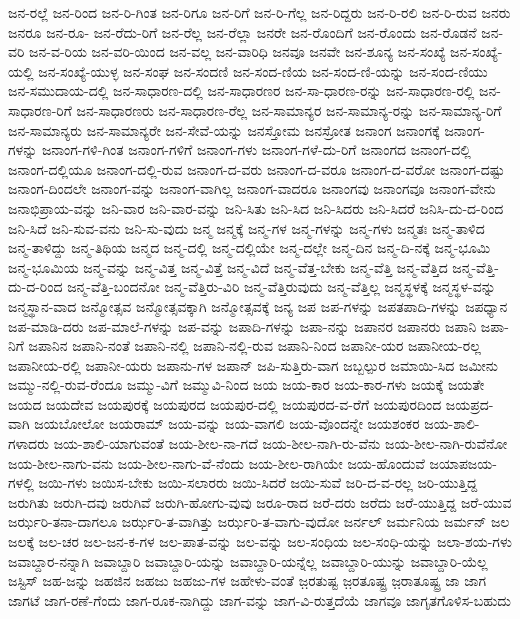 {ಜನ-ರಲ್ಲೆ
ಜನ-ರಿಂದ
ಜನ-ರಿ-ಗಿಂತ
ಜನ-ರಿಗೂ
ಜನ-ರಿಗೆ
ಜನ-ರಿ-ಗೆಲ್ಲ
ಜನ-ರಿದ್ದರು
ಜನ-ರಿ-ರಲಿ
ಜನ-ರಿ-ರುವ
ಜನರು
ಜನರೂ
ಜನ-ರೂ-
ಜನ-ರೆದು-ರಿಗೆ
ಜನ-ರೆಲ್ಲ
ಜನ-ರೆಲ್ಲಾ
ಜನರೇ
ಜನ-ರೊಂದಿಗೆ
ಜನ-ರೊಂದು
ಜನ-ರೊಡನೆ
ಜನ-ವರಿ
ಜನ-ವ-ರಿಯ
ಜನ-ವರಿ-ಯಿಂದ
ಜನ-ವಲ್ಲ
ಜನ-ವಾರಿಧಿ
ಜನವೂ
ಜನವೇ
ಜನ-ಶೂನ್ಯ
ಜನ-ಸಂಖ್ಯೆ
ಜನ-ಸಂಖ್ಯೆ-ಯಲ್ಲಿ
ಜನ-ಸಂಖ್ಯೆ-ಯುಳ್ಳ
ಜನ-ಸಂಘ
ಜನ-ಸಂದಣಿ
ಜನ-ಸಂದ-ಣಿಯ
ಜನ-ಸಂದ-ಣಿ-ಯನ್ನು
ಜನ-ಸಂದ-ಣಿಯು
ಜನ-ಸಮುದಾಯ-ದಲ್ಲಿ
ಜನ-ಸಾಧಾರಣ-ದಲ್ಲಿ
ಜನ-ಸಾಧಾರಣರ
ಜನ-ಸಾ-ಧಾರಣ-ರನ್ನು
ಜನ-ಸಾಧಾರಣ-ರಲ್ಲಿ
ಜನ-ಸಾಧಾರಣ-ರಿಗೆ
ಜನ-ಸಾಧಾರಣರು
ಜನ-ಸಾಧಾರಣ-ರೆಲ್ಲ
ಜನ-ಸಾಮಾನ್ಯರ
ಜನ-ಸಾಮಾನ್ಯ-ರನ್ನು
ಜನ-ಸಾಮಾನ್ಯ-ರಿಗೆ
ಜನ-ಸಾಮಾನ್ಯರು
ಜನ-ಸಾಮಾನ್ಯರೇ
ಜನ-ಸೇವೆ-ಯನ್ನು
ಜನಸ್ತೋಮ
ಜನಸ್ರೋತ
ಜನಾಂಗ
ಜನಾಂಗಕ್ಕೆ
ಜನಾಂಗ-ಗಳನ್ನು
ಜನಾಂಗ-ಗಳಿ-ಗಿಂತ
ಜನಾಂಗ-ಗಳಿಗೆ
ಜನಾಂಗ-ಗಳು
ಜನಾಂಗ-ಗಳೆ-ದು-ರಿಗೆ
ಜನಾಂಗದ
ಜನಾಂಗ-ದಲ್ಲಿ
ಜನಾಂಗ-ದಲ್ಲಿಯೂ
ಜನಾಂಗ-ದಲ್ಲಿ-ರುವ
ಜನಾಂಗ-ದ-ವರು
ಜನಾಂಗ-ದ-ವರೂ
ಜನಾಂಗ-ದ-ವರೋ
ಜನಾಂಗ-ದಷ್ಟು
ಜನಾಂಗ-ದಿಂದಲೇ
ಜನಾಂಗ-ವನ್ನು
ಜನಾಂಗ-ವಾಗಿಲ್ಲ
ಜನಾಂಗ-ವಾದರೂ
ಜನಾಂಗವು
ಜನಾಂಗವೂ
ಜನಾಂಗ-ವೇನು
ಜನಾಭಿಪ್ರಾಯ-ವನ್ನು
ಜನಿ-ವಾರ
ಜನಿ-ವಾರ-ವನ್ನು
ಜನಿ-ಸಿತು
ಜನಿ-ಸಿದ
ಜನಿ-ಸಿದರು
ಜನಿ-ಸಿದರೆ
ಜನಿಸಿ-ದು-ದ-ರಿಂದ
ಜನಿ-ಸಿದೆ
ಜನಿ-ಸುವ-ವನು
ಜನಿ-ಸು-ವುದು
ಜನ್ಮ
ಜನ್ಮಕ್ಕೆ
ಜನ್ಮ-ಗಳ
ಜನ್ಮ-ಗಳನ್ನು
ಜನ್ಮ-ಗಳು
ಜನ್ಮತಃ
ಜನ್ಮ-ತಾಳಿದ
ಜನ್ಮ-ತಾಳಿದ್ದು
ಜನ್ಮ-ತಿಥಿಯ
ಜನ್ಮದ
ಜನ್ಮ-ದಲ್ಲಿ
ಜನ್ಮ-ದಲ್ಲಿಯೇ
ಜನ್ಮ-ದಲ್ಲೇ
ಜನ್ಮ-ದಿನ
ಜನ್ಮ-ದಿ-ನಕ್ಕೆ
ಜನ್ಮ-ಭೂಮಿ
ಜನ್ಮ-ಭೂಮಿಯ
ಜನ್ಮ-ವನ್ನು
ಜನ್ಮ-ವಿತ್ತ
ಜನ್ಮ-ವಿತ್ತೆ
ಜನ್ಮ-ವಿದೆ
ಜನ್ಮ-ವೆತ್ತ-ಬೇಕು
ಜನ್ಮ-ವೆತ್ತಿ
ಜನ್ಮ-ವೆತ್ತಿದ
ಜನ್ಮ-ವೆತ್ತಿ-ದು-ದ-ರಿಂದ
ಜನ್ಮ-ವೆತ್ತಿ-ಬಂದನೋ
ಜನ್ಮ-ವೆತ್ತಿರು-ವಿರಿ
ಜನ್ಮ-ವೆತ್ತಿರುವುದು
ಜನ್ಮ-ವೆತ್ತಿಲ್ಲ
ಜನ್ಮಸ್ಥಳಕ್ಕೆ
ಜನ್ಮಸ್ಥಳ-ವನ್ನು
ಜನ್ಮಸ್ಥಾನ-ವಾದ
ಜನ್ಮೋತ್ಸವ
ಜನ್ಮೋತ್ಸವಕ್ಕಾಗಿ
ಜನ್ಮೋತ್ಸವಕ್ಕೆ
ಜನ್ಯ
ಜಪ
ಜಪ-ಗಳನ್ನು
ಜಪತಪಾದಿ-ಗಳನ್ನು
ಜಪಧ್ಯಾನ
ಜಪ-ಮಾಡಿ-ದರು
ಜಪ-ಮಾಲೆ-ಗಳನ್ನು
ಜಪ-ವನ್ನು
ಜಪಾದಿ-ಗಳನ್ನು
ಜಪಾ-ನನ್ನು
ಜಪಾನರ
ಜಪಾನರು
ಜಪಾನಿ
ಜಪಾ-ನಿಗೆ
ಜಪಾನಿನ
ಜಪಾನಿ-ನಂತೆ
ಜಪಾನಿ-ನಲ್ಲಿ
ಜಪಾನಿ-ನಲ್ಲಿ-ರುವ
ಜಪಾನಿ-ನಿಂದ
ಜಪಾನೀ-ಯರ
ಜಪಾನೀಯ-ರಲ್ಲ
ಜಪಾನೀಯ-ರಲ್ಲಿ
ಜಪಾನೀ-ಯರು
ಜಪಾನು-ಗಳ
ಜಪಾನ್
ಜಪಿ-ಸುತ್ತಿರು-ವಾಗ
ಜಬ್ಬಲ್ಪುರ
ಜಮಾಯಿ-ಸಿದ
ಜಮೀನು
ಜಮ್ಮು-ನಲ್ಲಿ-ರುವ-ರೆಂದೂ
ಜಮ್ಮು-ವಿಗೆ
ಜಮ್ಮುವಿ-ನಿಂದ
ಜಯ
ಜಯ-ಕಾರ
ಜಯ-ಕಾರ-ಗಳು
ಜಯಕ್ಕೆ
ಜಯತೇ
ಜಯದ
ಜಯದೇವ
ಜಯಪುರಕ್ಕೆ
ಜಯಪುರದ
ಜಯಪುರ-ದಲ್ಲಿ
ಜಯಪುರದ-ವ-ರೆಗೆ
ಜಯಪುರದಿಂದ
ಜಯಪ್ರದ-ವಾಗಿ
ಜಯಬೋಲೋ
ಜಯರಾಮ್
ಜಯ-ವನ್ನು
ಜಯ-ವಾಗಲಿ
ಜಯ-ವೊಂದನ್ನೇ
ಜಯಶಂಕರ
ಜಯ-ಶಾಲಿ-ಗಳಾದರು
ಜಯ-ಶಾಲಿ-ಯಾಗುವಂತೆ
ಜಯ-ಶೀಲ-ನಾ-ಗದೆ
ಜಯ-ಶೀಲ-ನಾಗಿ-ರು-ವೆನು
ಜಯ-ಶೀಲ-ನಾಗಿ-ರುವೆನೋ
ಜಯ-ಶೀಲ-ನಾಗು-ವನು
ಜಯ-ಶೀಲ-ನಾಗು-ವೆ-ನೆಂದು
ಜಯ-ಶೀಲ-ರಾಗಿಯೇ
ಜಯ-ಹೊಂದುವೆ
ಜಯಾಪಜಯ-ಗಳಲ್ಲಿ
ಜಯಿ-ಗಳು
ಜಯಿಸ-ಬೇಕು
ಜಯಿ-ಸಲಾರರು
ಜಯಿ-ಸಿದರೆ
ಜಯಿ-ಸುವೆ
ಜರಿ-ದ-ವ-ರಲ್ಲ
ಜರಿ-ಯುತ್ತಿದ್ದ
ಜರುಗಿತು
ಜರುಗಿ-ದವು
ಜರುಗಿವೆ
ಜರುಗಿ-ಹೋಗು-ವುವು
ಜರೂ-ರಾದ
ಜರೆ-ದರು
ಜರೆದು
ಜರೆ-ಯುತ್ತಿದ್ದ
ಜರೆ-ಯುವ
ಜರ್ಝರಿ-ತನಾ-ದಾಗಲೂ
ಜರ್ಝರಿ-ತ-ವಾಗಿತ್ತು
ಜರ್ಝರಿ-ತ-ವಾಗು-ವುದೋ
ಜರ್ನಲ್
ಜರ್ಮನಿಯ
ಜರ್ಮನ್
ಜಲ
ಜಲಕ್ಕೆ
ಜಲ-ಚರ
ಜಲ-ಜನ-ಕ-ಗಳ
ಜಲ-ಪಾತ-ವನ್ನು
ಜಲ-ವನ್ನು
ಜಲ-ಸಂಧಿಯ
ಜಲ-ಸಂಧಿ-ಯನ್ನು
ಜಲಾ-ಶಯ-ಗಳು
ಜವಾಬ್ದಾರ-ನನ್ನಾಗಿ
ಜವಾಬ್ದಾರಿ
ಜವಾಬ್ದಾರಿ-ಯನ್ನು
ಜವಾಬ್ದಾರಿ-ಯನ್ನೆಲ್ಲ
ಜವಾಬ್ದಾರಿ-ಯುನ್ನು
ಜವಾಬ್ದಾರಿ-ಯೆಲ್ಲ
ಜಸ್ಟಿಸ್
ಜಹ-ಜನ್ನು
ಜಹಜಿನ
ಜಹಜು
ಜಹಜು-ಗಳ
ಜಹೇಳು-ವಂತೆ
ಜ಼ರತುಷ್ಟ
ಜ಼ರತೂಷ್ಟ್ರ
ಜ಼ರಾತೂಷ್ಟ್ರ
ಜಾ
ಜಾಗ
ಜಾಗಟೆ
ಜಾಗ-ರಣೆ-ಗೆಂದು
ಜಾಗ-ರೂಕ-ನಾಗಿದ್ದು
ಜಾಗ-ವನ್ನು
ಜಾಗ-ವಿ-ರುತ್ತದೆಯೆ
ಜಾಗವೂ
ಜಾಗೃತಗೊಳಿಸ-ಬಹುದು
}
